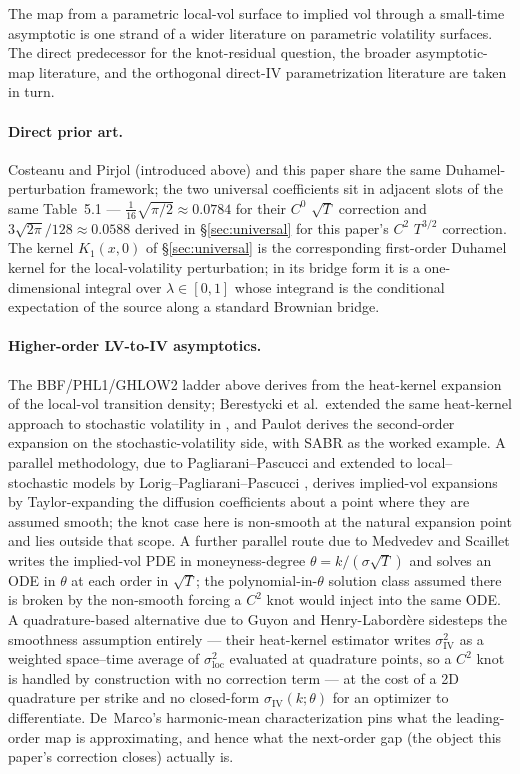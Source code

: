 \documentclass[11pt]{article}
\newcommand{\sloc}{\sigma_{\mathrm{loc}}}
\newcommand{\siv}{\sigma_{\mathrm{IV}}}
\begin{document}
The map from a parametric local-vol surface to implied vol through a
small-time asymptotic is one strand of a wider literature on parametric
volatility surfaces. The direct predecessor for the knot-residual
question, the broader asymptotic-map literature, and the orthogonal
direct-IV parametrization literature are taken in turn.

\paragraph{Direct prior art.} Costeanu and Pirjol
\citep{costeanuPirjol2011} (introduced above) and this paper share
the same Duhamel-perturbation framework; the two universal
coefficients sit in adjacent slots of the same Table~5.1 ---
$\tfrac{1}{16}\sqrt{\pi/2}\approx 0.0784$ for their $C^{0}$
$\sqrt{T}$ correction and $3\sqrt{2\pi}/128\approx 0.0588$ derived
in \S\ref{sec:universal} for this paper's $C^{2}$ $T^{3/2}$
correction. The kernel $K_1(x,0)$ of \S\ref{sec:universal} is the
corresponding first-order Duhamel kernel for the local-volatility
perturbation; in its bridge form it is a one-dimensional integral
over $\lambda\in[0,1]$ whose integrand is the conditional expectation
of the source along a standard Brownian bridge.

\paragraph{Higher-order LV-to-IV asymptotics.} The BBF/PHL1/GHLOW2
ladder above derives from the heat-kernel expansion of the local-vol
transition density; Berestycki et al.\ extended the same heat-kernel
approach to stochastic volatility in \citep{berestycki2004sv}, and
Paulot \citep{paulot2009} derives the second-order expansion on the
stochastic-volatility side, with SABR as the worked example. A parallel
methodology, due to Pagliarani--Pascucci \citep{pagliarani2012} and
extended to local--stochastic models by Lorig--Pagliarani--Pascucci
\citep{lorig2017}, derives implied-vol
expansions by Taylor-expanding the diffusion coefficients about a
point where they are assumed smooth; the knot case here is non-smooth
at the natural expansion point and lies outside that scope. A further
parallel route due to Medvedev and Scaillet
\citep{medvedevScaillet2007} writes the implied-vol PDE in
moneyness-degree $\theta=k/(\sigma\sqrt T)$ and solves an ODE in
$\theta$ at each order in $\sqrt T$; the polynomial-in-$\theta$
solution class assumed there is broken by the non-smooth forcing a
$C^2$ knot would inject into the same ODE. A
quadrature-based alternative due to Guyon and Henry-Labord\`ere
\citep{guyonHenryLabordere2010} sidesteps the smoothness assumption
entirely --- their heat-kernel estimator writes $\siv^2$ as a
weighted space--time average of $\sloc^2$ evaluated at quadrature
points, so a $C^2$ knot is handled by construction with no
correction term --- at the cost of a 2D quadrature per strike and
no closed-form $\siv(k;\theta)$ for an optimizer to differentiate.
De~Marco's harmonic-mean characterization \citep{demarco2021} pins
what the leading-order map is approximating, and hence what the
next-order gap (the object this paper's correction closes) actually
is.
\end{document}
